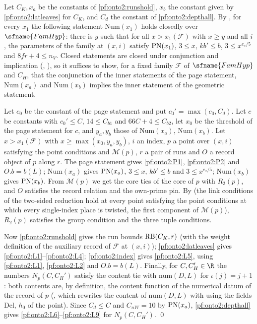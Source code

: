 Let $C_K,x_a$ be the constants of \cref{pf:onto2:runshold}, $x_b$ the constant given by \cref{pf:onto2:latleaves} for $C_K$, and $C_d$
the constant of \cref{pf:onto2:depthall}. By , for every $x_1$ the
following statement $\mathrm{Num}(x_1)$ holds closedly over $\sfname{FamHyp}$: there is $y$ such that for all $x>x_1(\mathcal F)$ with
$x\ge y$ and all $i$, the parameters of the family at $(x,i)$ satisfy $\mathrm{PN}(x_1)$, $3\le x$, $kb'\le b$, $3\le x^{e_z/5}$ and
$8fr+4\le n_V$. Closed statements are closed under conjunction and implication (,
), so it suffices to show, for a fixed family $\mathcal F$ of $\sfname{FamHyp}$ and $C_H$,
that the conjunction of the inner statements of the page statement, $\mathrm{Num}(x_a)$ and $\mathrm{Num}(x_b)$ implies the inner
statement of the geometric statement.

Let $c_0$ be the constant of the page statement and put $c_0'=\max(c_0,C_d)$. Let $c$ be constants with $c_0'\le C$, $14\le C_{b1}$
and $66C+4\le C_{b2}$, let $x_0$ be the threshold of the page statement for $c$, and $y_a,y_b$ those of $\mathrm{Num}(x_a)$,
$\mathrm{Num}(x_b)$. Let $x>x_1(\mathcal F)$ with $x\ge\max(x_0,y_a,y_b)$, $i$ an index, $p$ a point over $(x,i)$ satisfying the point
conditions and $\mathcal M(p)$, $r$ a pair of runs and $O$ a record object of $p$ along $r$. The page statement gives \ref{pf:onto2:P1},
\ref{pf:onto2:P2} and $O.b=b(L)$; $\mathrm{Num}(x_a)$ gives $\mathrm{PN}(x_a)$, $3\le x$, $kb'\le b$ and $3\le x^{e_z/5}$;
$\mathrm{Num}(x_b)$ gives $\mathrm{PN}(x_b)$. From $\mathcal M(p)$ we get the core ties of the core of $p$ with $R_2(p)$, and $O$ satisfies
the record relation and the own-prime pin. By  (the link conditions of the
two-sided reduction hold at every point satisfying the point conditions at which every single-index place is twisted, the first
component of $\mathcal M(p)$), $R_2(p)$ satisfies the group condition and the three tuple conditions.

Now \cref{pf:onto2:runshold} gives the run bounds $\mathrm{RB}(C_K,r)$ (with the weight definition of the auxiliary record of $\mathcal F$
at $(x,i)$); \cref{pf:onto2:latleaves} gives \ref{pf:onto2:L1}--\ref{pf:onto2:L4}; \cref{pf:onto2:index} gives \ref{pf:onto2:L5}, using
\ref{pf:onto2:L1}, \ref{pf:onto2:L2} and $O.b=b(L)$. Finally, for $C,C_H'\in\R$ the numbers $N_p(C,C_H')$ satisfy the content
tie with $\mathrm{num}(D,L)$ for $\iota(j)=j+1$: both contents are, by definition, the content function of the numerical datum of the
record of $p$ (, which rewrites the content of
$\mathrm{num}(D,L)$ with  using the fields $\mathrm{Del}$, $h_0$ of the point).
Since $C_d\le C$ and $C_{nW}=10$ by $\mathrm{PN}(x_a)$, \cref{pf:onto2:depthall} gives \ref{pf:onto2:L6}--\ref{pf:onto2:L9} for
$N_p(C,C_H')$. \qed

